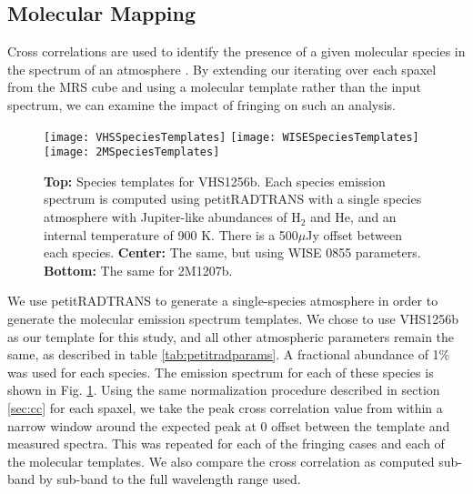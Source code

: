 \subsection{Molecular Mapping}
Cross correlations are used to identify the presence of a given molecular species in the spectrum of an atmosphere \parencite{Hoeijmakers2018,Haffert2019}.
By extending our iterating over each spaxel from the MRS cube and using a molecular template rather than the input spectrum, we can examine the impact of fringing on such an analysis.
\begin{figure}[t]
	\texttt{[image: VHSSpeciesTemplates]}
	\texttt{[image: WISESpeciesTemplates]}
	\texttt{[image: 2MSpeciesTemplates]}
	\caption{\textbf{Top:} Species templates for VHS1256b. Each species emission spectrum is computed using petitRADTRANS with a single species atmosphere with Jupiter-like abundances of H$_{2}$ and He, and an internal temperature of 900 K. There is a 500$\mu$Jy offset between each species. \textbf{Center:} The same, but using WISE 0855 parameters. \textbf{Bottom:} The same for 2M1207b.}
	\label{fig:speciestemplates}
\end{figure}

We use petitRADTRANS to generate a single-species atmosphere in order to generate the molecular emission spectrum templates. 
We chose to use VHS1256b as our template for this study, and all other atmospheric parameters remain the same, as described in table \ref{tab:petitradparams}. 
A fractional abundance of 1\% was used for each species.
The emission spectrum for each of these species is shown in Fig. \ref{fig:speciestemplates}.
Using the same normalization procedure described in section \ref{sec:cc} for each spaxel, we take the peak cross correlation value from within a narrow window around the expected peak at 0 offset between the template and measured spectra. 
This was repeated for each of the fringing cases and each of the molecular templates. 
We also compare the cross correlation as computed sub-band by sub-band to the full wavelength range used.
\clearpage

